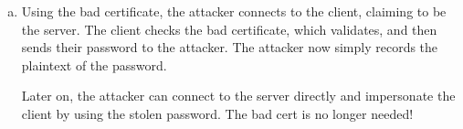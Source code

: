 \documentclass{article}[12pt]
\begin{document}
\begin{enumerate}[1.]
\begin{enumerate}[(a)]
\item Using the bad certificate, the attacker connects to the client, claiming to be the server. The client checks the bad certificate, which validates, and then sends their password to the attacker. The attacker now simply records the plaintext of the password.

Later on, the attacker can connect to the server directly and impersonate the client by using the stolen password. The bad cert is no longer needed!
\end{enumerate}

\end{enumerate}
\end{document}

